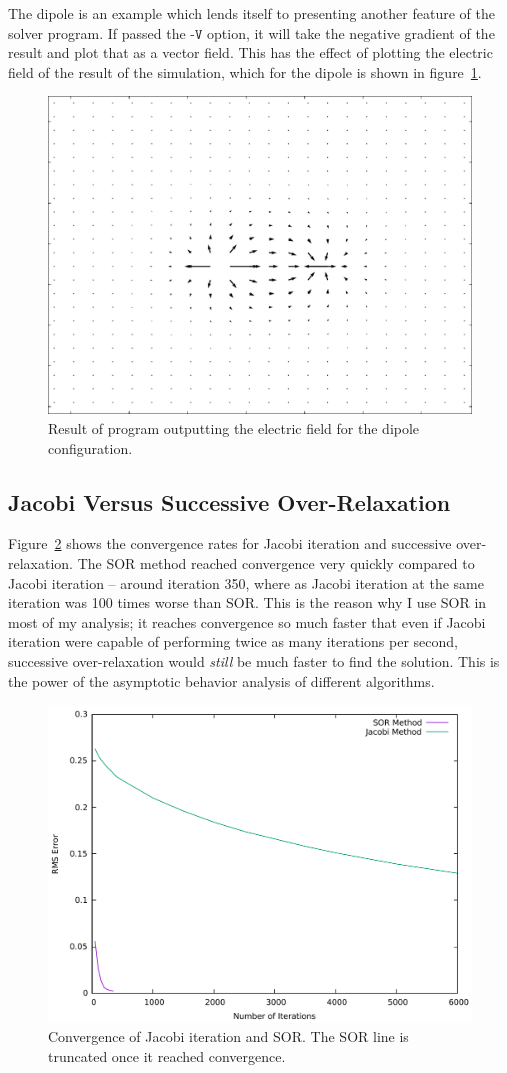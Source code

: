 The dipole is an example which lends itself to presenting another feature of the solver program. If passed the
$\texttt{-V}$ option, it will take the negative gradient of the result and plot that as a vector field. This has
the effect of plotting the electric field of the result of the simulation, which for the dipole is shown in
figure~\ref{fig:dipole-field}.

	\begin{figure}[h]
	\centering
	\includegraphics[width=0.7\linewidth]{dipole_field.pdf}
	\caption{Result of program outputting the electric field for the dipole configuration.} \label{fig:dipole-field}
	\end{figure}


\subsection{Jacobi Versus Successive Over-Relaxation}
Figure~\ref{fig:jacsor} shows the convergence rates for Jacobi iteration and successive over-relaxation. The SOR method
reached convergence very quickly compared to Jacobi iteration -- around iteration 350, where as Jacobi iteration at the
same iteration was 100 times worse than SOR. This is the reason why I use SOR in most of my analysis; it reaches convergence
so much faster that even if Jacobi iteration were capable of performing twice as many iterations per second, successive over-relaxation
would \textit{still} be much faster to find the solution. This is the power of the asymptotic behavior analysis of different algorithms.

	\begin{figure}[h]
	\centering
	\includegraphics[width=0.7\linewidth]{jacsor.pdf}
	\caption{Convergence of Jacobi iteration and SOR. The SOR line is truncated once it reached convergence.} \label{fig:jacsor}
	\end{figure}



